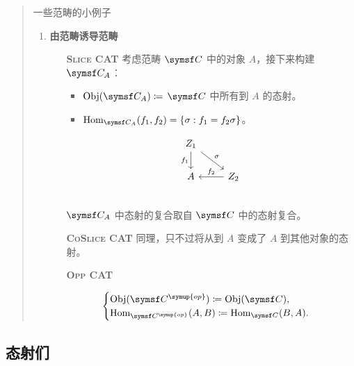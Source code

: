 \begin{quote}{一些范畴的小例子}
\begin{enumerate}[label = \textbf{\arabic*.}]
\begin{itemize}
              \end{itemize}
        \item \textbf{由范畴诱导范畴}
              \begin{itemize}
                  \item [\scshape\bfseries Slice CAT]
                        考虑范畴 \(\symsf C\) 中的对象 \(A\)，接下来构建 \(\symsf C_A\)：
                        \begin{itemize}
                            \item \(\Obj(\symsf C_A) \coloneqq \)  \(\symsf C\) 中所有到 \(A\) 的态射。
                            \item \(\Hom_{\symsf C_A}(f_1,f_2) = \left\{ \sigma :f_1=f_2 \sigma  \right\} \)。
                        \end{itemize}
                        \[
                            \begin{tikzcd}
                                Z_1\arrow[d, "f_1"']\arrow[rd, "\sigma "] & {}                    \\
                                A                                         & \arrow[l,"f_2"']  Z_2 \\
                            \end{tikzcd}
                        \]
                        \(\symsf C_A\) 中态射的复合取自 \(\symsf C\) 中的态射复合。
                  \item [\scshape\bfseries CoSlice CAT]
                        同理，只不过将从到 \(A\) 变成了 \(A\) 到其他对象的态射。
                  \item [\scshape\bfseries Opp CAT]
                        \begin{itemize}
                            \[
                                \begin{cases}
                                    \Obj(\symsf C^{\symup{op}})\coloneqq \Obj(\symsf C), \\
                                    \Hom_{\symsf C^{\symup{op}}}(A,B)\coloneqq \Hom_{\symsf C}(B,A).
                                \end{cases}
                            \]
                        \end{itemize}
              \end{itemize}
    \end{enumerate}
\end{quote}


\subsection{态射们}



